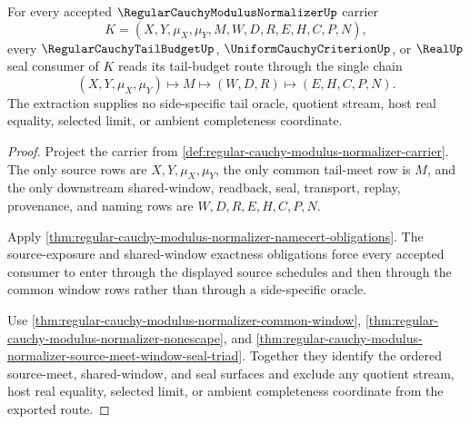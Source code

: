 \begin{theorem}
\label{thm:regular-cauchy-modulus-normalizer-tail-budget-extraction}
For every accepted $\RegularCauchyModulusNormalizerUp$ carrier
$$
K=(X,Y,\mu_X,\mu_Y,M,W,D,R,E,H,C,P,N),
$$
every $\RegularCauchyTailBudgetUp$, $\UniformCauchyCriterionUp$, or $\RealUp$
seal consumer of $K$ reads its tail-budget route through the single chain
$$
(X,Y,\mu_X,\mu_Y) \longmapsto M \longmapsto (W,D,R) \longmapsto (E,H,C,P,N).
$$
The extraction supplies no side-specific tail oracle, quotient stream, host real
equality, selected limit, or ambient completeness coordinate.
\end{theorem}
\begin{proof}
Project the carrier from \autoref{def:regular-cauchy-modulus-normalizer-carrier}.
The only source rows are $X,Y,\mu_X,\mu_Y$, the only common tail-meet row is
$M$, and the only downstream shared-window, readback, seal, transport, replay,
provenance, and naming rows are $W,D,R,E,H,C,P,N$.

Apply \autoref{thm:regular-cauchy-modulus-normalizer-namecert-obligations}. The
source-exposure and shared-window exactness obligations force every accepted
consumer to enter through the displayed source schedules and then through the
common window rows rather than through a side-specific oracle.

Use \autoref{thm:regular-cauchy-modulus-normalizer-common-window},
\autoref{thm:regular-cauchy-modulus-normalizer-nonescape}, and
\autoref{thm:regular-cauchy-modulus-normalizer-source-meet-window-seal-triad}.
Together they identify the ordered source-meet, shared-window, and seal
surfaces and exclude any quotient stream, host real equality, selected limit,
or ambient completeness coordinate from the exported route.
\end{proof}

